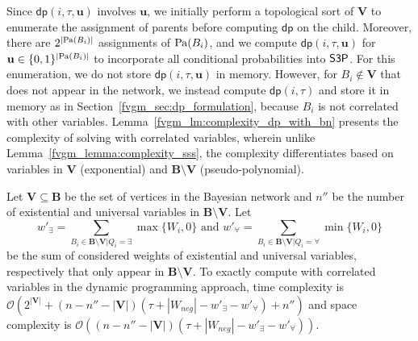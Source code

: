 Since $ \mathsf{dp}(i, \tau, \mathbf{u}) $ involves  $ \mathbf{u} $, we initially perform a topological sort of $ \mathbf{V} $ to enumerate the assignment of parents before computing $ \mathsf{dp} $ on the child. Moreover, there are $ 2^{|\mathrm{Pa}(B_i)|} $ assignments of $ \mathrm{Pa}(B_i) $, and we compute $ \mathsf{dp}(i, \tau, \mathbf{u}) $ for $ \mathbf{u} \in \{0,1\}^{|\mathrm{Pa}(B_i)|} $ to incorporate all conditional probabilities into $ \mathsf{S3P} $.  For this enumeration, we do not store $ \mathsf{dp}(i, \tau, \mathbf{u}) $ in memory. However, for $ B_i \not \in \mathbf{V} $ that does not appear in the network, we instead compute $ \mathsf{dp}(i, \tau) $ and store it in memory as in Section~\ref{fvgm_sec:dp_formulation}, because $ B_i $ is not correlated with other variables.  Lemma~\ref{fvgm_lm:complexity_dp_with_bn} presents the complexity of solving {\stochastic} with correlated variables, wherein unlike Lemma~\ref{fvgm_lemma:complexity_sss}, the  complexity differentiates based on variables in $ \mathbf{V} $ (exponential) and $ \mathbf{B}\setminus \mathbf{V} $ (pseudo-polynomial). 


\begin{lemma}
	\label{fvgm_lm:complexity_dp_with_bn}
	Let $ \mathbf{V} \subseteq \mathbf{B} $ be the set of vertices in the Bayesian network and $ n'' $ be the number of existential and universal variables in $ \mathbf{B} \setminus \mathbf{V} $. Let $$ w'_{\exists} = \sum_{B_i \in \mathbf{B} \setminus \mathbf{V} | Q_i = \exists} \max\{W_i, 0\} \text{ and } w'_{\forall} = \sum_{B_i \in \mathbf{B} \setminus \mathbf{V} | Q_i = \forall} \min\{W_i, 0\}$$ be the sum of considered weights of existential and universal variables, respectively that only appear in $ \mathbf{B} \setminus \mathbf{V} $. To exactly compute {\stochastic} with correlated variables in the dynamic programming approach,  time complexity is $ \mathcal{O}(2^{|\mathbf{V}|} + (n - n'' - |\mathbf{V}|)(\tau + |W_{neg}| - w'_{\exists} - w'_{\forall}) + n'') $ and space complexity is $ \mathcal{O}((n - n'' - |\mathbf{V}|)(\tau + |W_{neg}| - w'_{\exists} - w'_{\forall})) $.
\end{lemma}	


